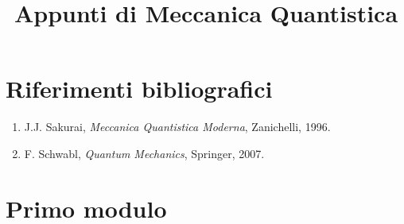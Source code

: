 \documentclass[11pt,a4paper]{article}
\title{\textbf{Appunti di Meccanica Quantistica}}
\author{}
\date{}
\begin{document}
\maketitle

\tableofcontents
\pagebreak

\section*{Riferimenti bibliografici}
\begin{enumerate}
\item J.J. Sakurai, \textit{Meccanica Quantistica Moderna}, Zanichelli, 1996.
\item F. Schwabl, \textit{Quantum Mechanics}, Springer, 2007.
\end{enumerate}
\pagebreak

\section{Primo modulo}





































\pagebreak
\end{document}
